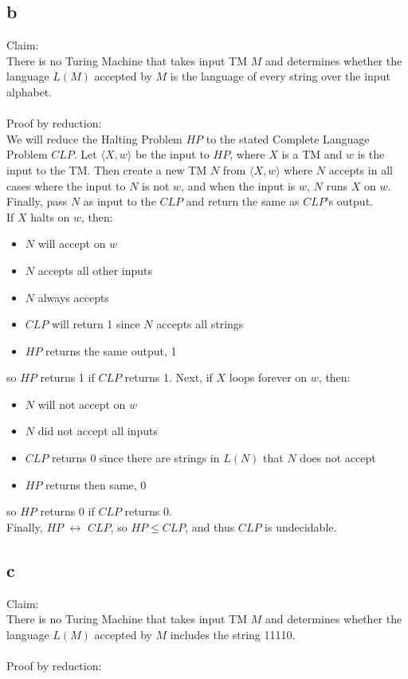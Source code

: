 \documentclass[letterpaper,notitlepage,twoside]{article}
\begin{document}
\subsection*{b}
Claim:\\
There is no Turing Machine that takes input TM $M$ and determines whether the language $L(M)$ accepted by $M$ is the language of every string over the input alphabet.\\\\
Proof by reduction:\\
We will reduce the Halting Problem $HP$ to the stated Complete Language Problem $CLP$. Let $\langle X, w \rangle$ be the input to $HP$, where $X$ is a TM and $w$ is the input to the TM.  Then create a new TM $N$ from $\langle X, w \rangle$ where $N$ accepts in all cases where the input to $N$ is not $w$, and when the input is $w$, $N$ runs $X$ on $w$. Finally, pass $N$ as input to the $CLP$ and return the same as $CLP$'s output.\\
If $X$ halts on $w$, then:
\begin{itemize}
\item $N$ will accept on $w$
\item $N$ accepts all other inputs
\item $N$ always accepts
\item $CLP$ will return 1 since $N$ accepts all strings
\item $HP$ returns the same output, 1
\end{itemize}
so $HP$ returns 1 if $CLP$ returns 1.
Next, if $X$ loops forever on $w$, then:
\begin{itemize}
\item $N$ will not accept on $w$
\item $N$ did not accept all inputs
\item $CLP$ returns 0 since there are strings in $L(N)$ that $N$ does not accept
\item $HP$ returns then same, 0
\end{itemize}
so $HP$ returns 0 if $CLP$ returns 0.\\
Finally, $HP$ $\leftrightarrow$ $CLP$, so $HP \le CLP$, and thus $CLP$ is undecidable.

\subsection*{c}
Claim:\\
There is no Turing Machine that takes input TM $M$ and determines whether the language $L(M)$ accepted by $M$ includes the string 11110.\\\\
Proof by reduction:\\
\end{document}
